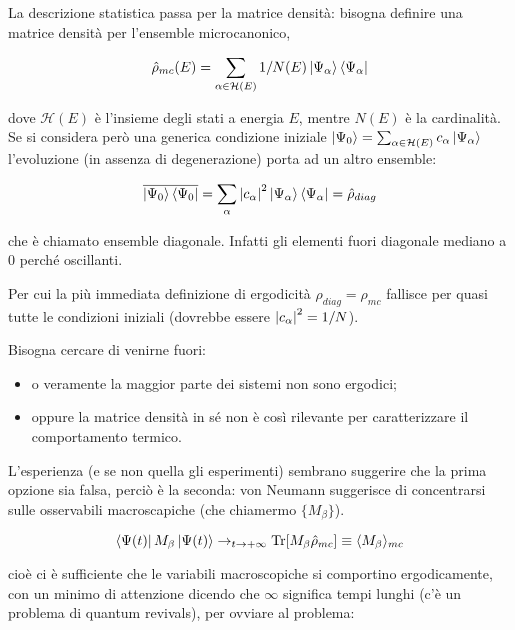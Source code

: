 \documentclass[a4paper,10pt,twocolumn]{article}
\begin{document}
\noindent La descrizione statistica passa per la matrice densità: bisogna definire una matrice densità per l'ensemble microcanonico,

\begin{equation}
	\hat{\rho}_{mc}(E) = \sum_{\alpha \in \mathcal{H}(E)} 1/N(E) \ket{\Psi_\alpha}\bra{\Psi_\alpha} 
\end{equation}

\noindent dove $\mathcal{H}(E)$ è l'insieme degli stati a energia $E$, mentre $N(E)$ è la cardinalità.
Se si considera però una generica condizione iniziale $\ket{\Psi_0} = \sum_{\alpha \in \mathcal{H}(E)} c_\alpha \ket{\Psi_\alpha}$ l'evoluzione (in assenza di degenerazione) porta ad un altro ensemble:

\begin{equation}
	\overline{\ket{\Psi_0} \bra{\Psi_0}} = \sum_{\alpha} \abs{c_\alpha}^2 \ket{\Psi_\alpha} \bra{\Psi_\alpha} = \hat{\rho}_{diag}
\end{equation}

\noindent che è chiamato ensemble diagonale. Infatti gli elementi fuori diagonale mediano a $0$ perché oscillanti.

\noindent Per cui la più immediata definizione di ergodicità $\rho_{diag} = \rho_{mc}$ fallisce per quasi tutte le condizioni iniziali (dovrebbe essere $\abs{c_\alpha}^2 = 1 / N$).
\newline

Bisogna cercare di venirne fuori:
\begin{itemize}
	\item o veramente la maggior parte dei sistemi non sono ergodici;
	\item oppure la matrice densità in sé non è così rilevante per caratterizzare il comportamento termico.
\end{itemize}

L'esperienza (e se non quella gli esperimenti) sembrano suggerire che la prima opzione sia falsa, perciò è la seconda: von Neumann suggerisce di concentrarsi sulle osservabili macroscapiche (che chiamermo $\{M_\beta\}$).

\begin{equation}
\bra{\Psi(t)} M_\beta \ket{\Psi(t)} \rightarrow_{t \rightarrow + \infty} \text{Tr}[M_\beta \hat{\rho}_{mc}] \equiv \langle M_\beta \rangle_{mc}
\end{equation}

\noindent cioè ci è sufficiente che le variabili macroscopiche si comportino ergodicamente, con un minimo di attenzione dicendo che $\infty$ significa tempi lunghi (c'è un problema di quantum revivals), per ovviare al problema:
\end{document}
